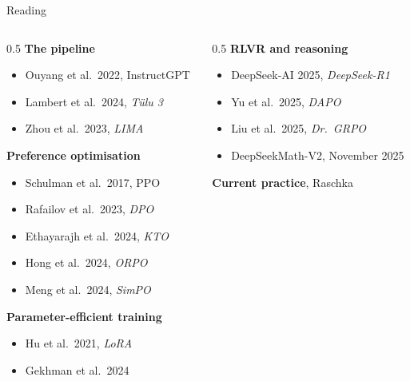\documentclass[aspectratio=169,10pt]{beamer}
\begin{document}
\begin{frame}[shrink=5]{Reading}
  \begin{columns}[T]
    \begin{column}{0.5\textwidth}
      \textbf{The pipeline}
      \begin{itemize}\small\setlength{\itemsep}{0pt}
        \item Ouyang et al.\ 2022, InstructGPT
        \item Lambert et al.\ 2024, \textit{Tülu 3}
        \item Zhou et al.\ 2023, \textit{LIMA}
      \end{itemize}
      \vspace{0.3em}
      \textbf{Preference optimisation}
      \begin{itemize}\small\setlength{\itemsep}{0pt}
        \item Schulman et al.\ 2017, PPO
        \item Rafailov et al.\ 2023, \textit{DPO}
        \item Ethayarajh et al.\ 2024, \textit{KTO}
        \item Hong et al.\ 2024, \textit{ORPO}
        \item Meng et al.\ 2024, \textit{SimPO}
      \end{itemize}
      \vspace{0.3em}
      \textbf{Parameter-efficient training}
      \begin{itemize}\small\setlength{\itemsep}{0pt}
        \item Hu et al.\ 2021, \textit{LoRA}
        \item Gekhman et al.\ 2024
      \end{itemize}
    \end{column}
    \begin{column}{0.5\textwidth}
      \textbf{RLVR and reasoning}
      \begin{itemize}\small\setlength{\itemsep}{0pt}
        \item DeepSeek-AI 2025, \textit{DeepSeek-R1}
        \item Yu et al.\ 2025, \textit{DAPO}
        \item Liu et al.\ 2025, \textit{Dr.\ GRPO}
        \item DeepSeekMath-V2, November 2025
      \end{itemize}
      \vspace{0.3em}
      \textbf{Current practice}, Raschka
      \begin{itemize}\small\setlength{\itemsep}{0pt}

\end{itemize}
\end{column}
\end{columns}
\end{frame}
\end{document}
